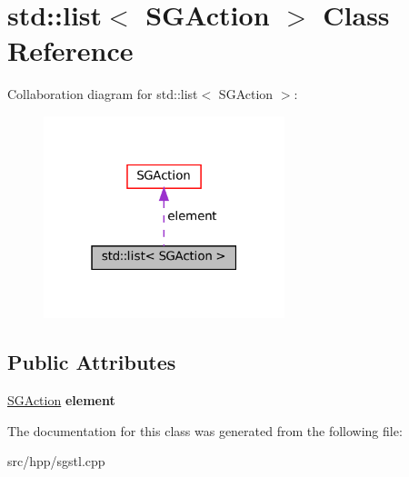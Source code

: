 \hypertarget{classstd_1_1list_3_01SGAction_01_4}{}\section{std\+:\+:list$<$ S\+G\+Action $>$ Class Reference}
\label{classstd_1_1list_3_01SGAction_01_4}


Collaboration diagram for std\+:\+:list$<$ S\+G\+Action $>$\+:
\nopagebreak
\begin{figure}[H]
\begin{center}
\leavevmode
\includegraphics[width=199pt]{classstd_1_1list_3_01SGAction_01_4__coll__graph}
\end{center}
\end{figure}
\subsection*{Public Attributes}
\begin{DoxyCompactItemize}
\item 
\mbox{\label{classstd_1_1list_3_01SGAction_01_4_ab9a0b8b7942980ededf0f2440901fb67}} 
\hyperlink{classSGAction}{S\+G\+Action} {\bfseries element}
\end{DoxyCompactItemize}


The documentation for this class was generated from the following file\+:\begin{DoxyCompactItemize}
\item 
src/hpp/sgstl.\+cpp\end{DoxyCompactItemize}
